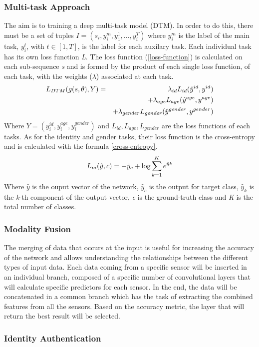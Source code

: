 \subsubsection{Multi-task Approach}
The aim is to training a deep multi-task model (DTM). In order to do this, 
there must be a set of tuples $ I = (s_i, y_i^m, y_1^1, ..., y_i^T) $ where $ y_i^m $ is the label 
of the main task, $ y_i^t $, with $ t \in [1,T] $, is the label for each auxilary task. 
Each individual task has its own loss function \emph{L}. The loss function (\ref{loss-function}) is 
calculated on each sub-sequence \emph{s} and is formed by the product of each single 
loss function, of each task, with the weights ($ \lambda $)  associated at each task.
\begin{eqnarray}\label{loss-function}
    \emph{$ L_{DTM} (g(s,\theta), Y) $} & = & \lambda_{id}L_{id}(\hat{y}^{id}, y^{id}) \nonumber \\
                                        &   & + \lambda_{age}L_{age}(\hat{y}^{age}, y^{age}) \nonumber \\
                                        &   & + \lambda_{gender}L_{gender}(\hat{y}^{gender}, y^{gender}) 
\end{eqnarray}
Where $ Y = (y^{id}_i, y^{age}_i, y^{gender}_i) $ and $ L_{id}, L_{age}, L_{gender} $ are the loss functions of 
each tasks. As for the identity and gender tasks, their loss function is the 
cross-entropy and is calculated with the formula \ref{cross-entropy}.
\begin{equation}\label{cross-entropy}
    \emph{$ L_m(\hat{y}, c) $} = -\hat{y}_c+\log\sum^K_{k=1}e^{\hat{y}k} 
\end{equation}
Where $ \hat{y} $ is the ouput vector of the network, $ \hat{y}_c $ is the output for target class, 
$ \hat{y}_k $ is the \emph{k}-th component of the output vector, \emph{c} is the ground-truth class 
and \emph{K} is the total number of classes.

\subsubsection{Modality Fusion}
The merging of data that occurs at the input is useful for increasing the accuracy of the 
network and allows understanding the relationships between 
the different types of input data. Each data coming from a specific sensor 
will be inserted in an individual branch, composed of a specific number of 
convolutional layers that will calculate specific predictors for each sensor. 
In the end, the data will be concatenated in a common branch which has the 
task of extracting the combined features from all the sensors. Based on the accuracy metric, the 
layer that will return the best result will be selected.

\subsubsection{Identity Authentication}